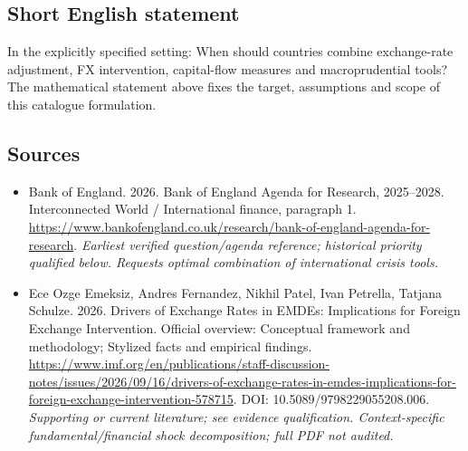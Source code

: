 \documentclass[11pt]{article}
\begin{document}
\subsection{Short English statement}
In the explicitly specified setting: When should countries combine exchange-rate adjustment, FX intervention, capital-flow measures and macroprudential tools? The mathematical statement above fixes the target, assumptions and scope of this catalogue formulation.

\subsection{Sources}
\begin{itemize}\raggedright
\item[\textnormal{[S1]}]\hypertarget{source:30007619:1}{} Bank of England. 2026. Bank of England Agenda for Research, 2025–2028. Interconnected World / International finance, paragraph 1.
\url{https://www.bankofengland.co.uk/research/bank-of-england-agenda-for-research}.
{\small\textit{Earliest verified question/agenda reference; historical priority qualified below. Requests optimal combination of international crisis tools.}}

\item[\textnormal{[S2]}]\hypertarget{source:30007619:2}{} Ece Ozge Emeksiz, Andres Fernandez, Nikhil Patel, Ivan Petrella, Tatjana Schulze. 2026. Drivers of Exchange Rates in EMDEs: Implications for Foreign Exchange Intervention. Official overview: Conceptual framework and methodology; Stylized facts and empirical findings.
\url{https://www.imf.org/en/publications/staff-discussion-notes/issues/2026/09/16/drivers-of-exchange-rates-in-emdes-implications-for-foreign-exchange-intervention-578715}.
DOI: 10.5089/9798229055208.006.
{\small\textit{Supporting or current literature; see evidence qualification. Context-specific fundamental/financial shock decomposition; full PDF not audited.}}
\end{itemize}
\end{document}
